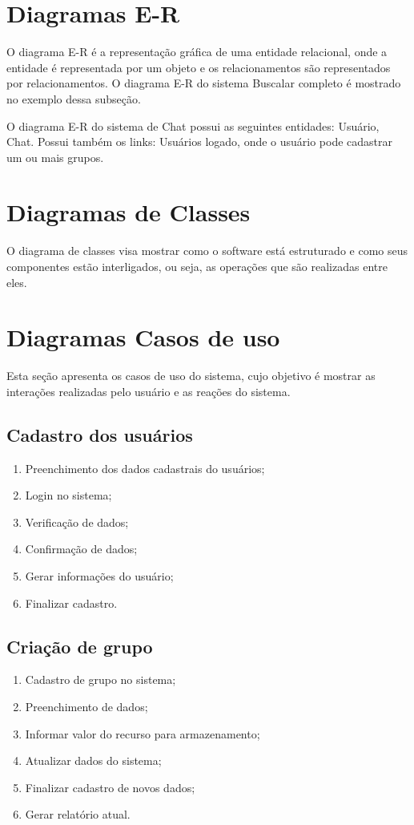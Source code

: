 \section{Diagramas E-R}
O diagrama E-R é a representação gráfica de uma entidade relacional, onde a entidade é representada por um objeto e os relacionamentos são representados por relacionamentos. O diagrama E-R do sistema Buscalar completo é mostrado no exemplo dessa subseção.

O diagrama E-R do sistema de Chat possui as seguintes entidades: Usuário, Chat. Possui também os links: Usuários logado, onde o usuário pode cadastrar um ou mais grupos.


\section{Diagramas de Classes}
O diagrama de classes visa mostrar como o software está estruturado e como seus componentes estão interligados, ou seja, as operações que são realizadas entre eles.

\section{Diagramas Casos de uso}


Esta seção apresenta os casos de uso do sistema, cujo objetivo é mostrar as interações realizadas pelo usuário e as reações do sistema.


\subsection{Cadastro dos usuários}
\begin{enumerate}
      \item Preenchimento dos dados cadastrais do usuários;
      \item Login no sistema;
      \item Verificação de dados;
      \item Confirmação de dados;
      \item Gerar informações do usuário;
      \item Finalizar cadastro.
\end{enumerate}

\subsection{Criação de grupo}
\begin{enumerate}
      \item Cadastro de grupo no sistema;
      \item Preenchimento de dados;
      \item Informar valor do recurso para armazenamento;
      \item Atualizar dados do sistema;
      \item Finalizar cadastro de novos dados;
      \item Gerar relatório atual.
\end{enumerate}


